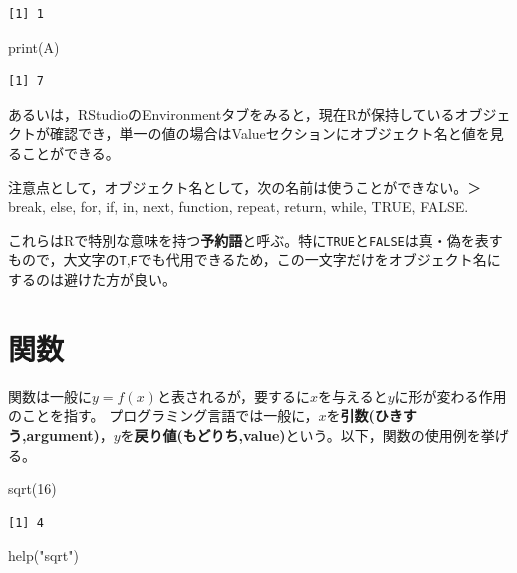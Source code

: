 \documentclass[
  a4paper,
]{ltjsbook}
\newenvironment{Shaded}{\begin{snugshade}}{\end{snugshade}}
\newcommand{\DecValTok}[1]{\textcolor[rgb]{0.68,0.00,0.00}{#1}}
\newcommand{\FunctionTok}[1]{\textcolor[rgb]{0.28,0.35,0.67}{#1}}
\newcommand{\NormalTok}[1]{\textcolor[rgb]{0.00,0.23,0.31}{#1}}
\newcommand{\StringTok}[1]{\textcolor[rgb]{0.13,0.47,0.30}{#1}}
\begin{document}
\begin{verbatim}
[1] 1
\end{verbatim}

\begin{Shaded}
\begin{Highlighting}[]
\FunctionTok{print}\NormalTok{(A)}
\end{Highlighting}
\end{Shaded}

\begin{verbatim}
[1] 7
\end{verbatim}

あるいは，RStudioのEnvironmentタブをみると，現在Rが保持しているオブジェクトが確認でき，単一の値の場合はValueセクションにオブジェクト名と値を見ることができる。

注意点として，オブジェクト名として，次の名前は使うことができない。＞
break, else, for, if, in, next, function, repeat, return, while, TRUE,
FALSE.

これらはRで特別な意味を持つ\textbf{予約語}と呼ぶ。特に\texttt{TRUE}と\texttt{FALSE}は真・偽を表すもので，大文字の\texttt{T},\texttt{F}でも代用できるため，この一文字だけをオブジェクト名にするのは避けた方が良い。

\section{関数}\label{ux95a2ux6570}

関数は一般に\(y=f(x)\)と表されるが，要するに\(x\)を与えると\(y\)に形が変わる作用のことを指す。
プログラミング言語では一般に，\(x\)を\textbf{引数(ひきすう,argument)}，\(y\)を\textbf{戻り値(もどりち,value)}という。以下，関数の使用例を挙げる。

\begin{Shaded}
\begin{Highlighting}[]
\FunctionTok{sqrt}\NormalTok{(}\DecValTok{16}\NormalTok{)}
\end{Highlighting}
\end{Shaded}

\begin{verbatim}
[1] 4
\end{verbatim}

\begin{Shaded}
\begin{Highlighting}[]
\FunctionTok{help}\NormalTok{(}\StringTok{"sqrt"}\NormalTok{)}
\end{Highlighting}
\end{Shaded}
\end{document}
